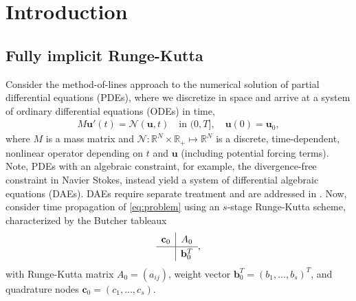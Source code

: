 \documentclass[review]{siamart}
\begin{document}
\section{Introduction}\label{sec:intro}

\subsection{Fully implicit Runge-Kutta}\label{sec:intro:irk}

Consider the method-of-lines approach to the numerical solution of partial differential
equations (PDEs), where we discretize in space and arrive at a system of ordinary
differential equations (ODEs) in time,
%
\begin{align}\label{eq:problem}
	M\mathbf{u}'(t) =  \mathcal{N}(\mathbf{u},t) \quad\text{in }(0,T], \quad \mathbf{u}(0) = \mathbf{u}_0,
\end{align}
%
where $M$ is a mass matrix and $\mathcal{N}:\mathbb{R}^{N} \times \mathbb{R}_+
\mapsto\mathbb{R}^{N}$ is a discrete, time-dependent, nonlinear operator
depending on $t$ and $\mathbf{u}$ (including potential forcing terms). Note,
PDEs with an algebraic constraint, for example, the divergence-free constraint
in Navier Stokes, instead yield a system of differential algebraic equations
(DAEs). DAEs require separate treatment and are addressed in .
Now, consider time propagation of \eqref{eq:problem} using an $s$-stage
Runge-Kutta scheme, characterized by the Butcher tableaux
%
\begin{align*}
	\renewcommand\arraystretch{1.2}
	\begin{array}
	{c|c}
	\mathbf{c}_0 & A_0\\
	\hline
	& \mathbf{b}_0^T
	\end{array},
\end{align*}
%
with Runge-Kutta matrix $A_0 = (a_{ij})$, weight vector $\mathbf{b}_0^T = (b_1, \ldots, b_s)^T$,
and quadrature nodes $\mathbf{c}_0 = (c_1, \ldots, c_s)$.
\end{document}
